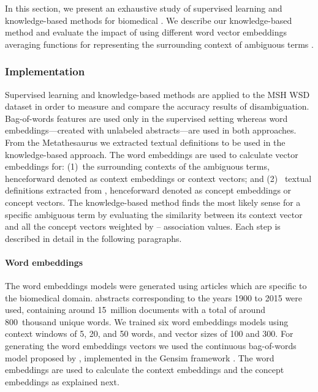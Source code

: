 In this section, we present an exhaustive study of supervised learning and knowledge-based methods for biomedical  \parencite{antunes2017c}.
We describe our knowledge-based method and evaluate the impact of using different word vector embeddings averaging functions for representing the surrounding context of ambiguous terms \parencite{antunes2017a,antunes2017b}.


\subsubsection{Implementation}

Supervised learning and knowledge-based methods are applied to the MSH WSD dataset in order to measure and compare the accuracy results of disambiguation.
Bag-of-words features are used only in the supervised setting whereas word embeddings---created with unlabeled  abstracts---are used in both approaches.
From the  Metathesaurus we extracted  textual definitions to be used in the knowledge-based approach.
The word embeddings are used to calculate vector embeddings for: (1)~the surrounding contexts of the ambiguous terms, henceforward denoted as context embeddings or context vectors; and (2)~ textual definitions extracted from , henceforward denoted as concept embeddings or concept vectors.
The knowledge-based method finds the most likely sense for a specific ambiguous term by evaluating the similarity between its context vector and all the concept vectors weighted by -- association values.
Each step is described in detail in the following paragraphs.


\paragraph{Word embeddings}

The word embeddings models were generated using  articles which are specific to the biomedical domain.
 abstracts corresponding to the years 1900 to 2015 were used, containing around 15~million documents with a total of around 800~thousand unique words.
We trained six word embeddings models using context windows of 5, 20, and 50 words, and vector sizes of 100 and 300.
For generating the word embeddings vectors we used the continuous bag-of-words model proposed by \textcite{mikolov2013b}, implemented in the Gensim framework \parencite{rehurek2010a}.
The word embeddings are used to calculate the context embeddings and the concept embeddings as explained next.


